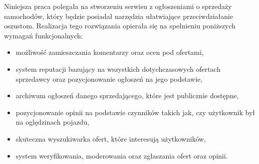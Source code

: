 Niniejsza praca polegała na stworzeniu serwisu z ogłoszeniami o sprzedaży samochodów, który będzie posiadał narzędzia ułatwiające przeciwdziałanie oszustom.
Realizacja tego rozwiązania opierała się na spełnieniu poniższych wymagań funkcjonalnych:
%
\begin{itemize}
    \item możliwość zamieszczania komentarzy oraz ocen pod ofertami,
    \item system reputacji bazujący na wszystkich dotychczasowych ofertach sprzedawcy oraz pozycjonowanie ogłoszeń na jego podstawie,
    \item archiwum ogłoszeń danego sprzedającego, które jest publicznie dostępne,
    \item pozycjonowanie opinii na podstawie czynników takich jak, czy użytkownik był na oględzinach pojazdu,
    \item skuteczna wyszukiwarka ofert, które interesują użytkowników,
    \item system weryfikowania, moderowania oraz zgłaszania ofert oraz opinii.
\end{itemize}
